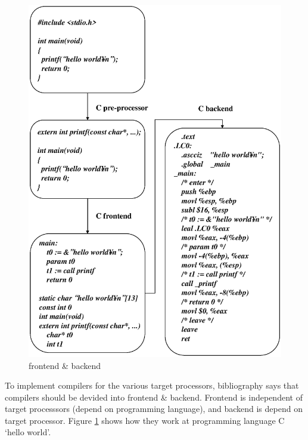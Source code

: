 \label{front_back_e000}

\begin{figure}[htbp]
\begin{center}
\includegraphics[width=1.0\linewidth,height=1.2\linewidth]{front_back_e.eps}
\caption{frontend \& backend}
\label{front_back_e007}
\end{center}
\end{figure}

To implement compilers for the various target processors, 
bibliography \cite{doragon} says that compilers should be devided into
 frontend \& backend.
Frontend is independent of target processsors
(depend on programming language), and backend is depend on
target processor. Figure \ref{front_back_e007} shows how they work
at programming language C `hello world'.

